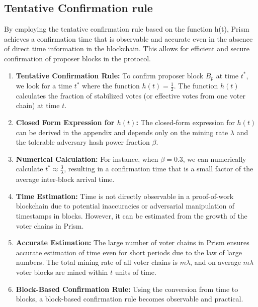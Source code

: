 \subsection{Tentative Confirmation rule}
By employing the tentative confirmation rule based on the function h(t), Prism achieves a confirmation time that is observable and accurate even in the absence of direct time information in the blockchain. This allows for efficient and secure confirmation of proposer blocks in the protocol.\\
\begin{enumerate}
    \item \textbf{Tentative Confirmation Rule:}  To confirm proposer block $B_{p}$ at time $t^{\ast}$, we look for a time $t^{\ast}$ where the function $h(t) = \frac{1}{2}$. The function $h(t)$ calculates the fraction of stabilized votes (or effective votes from one voter chain) at time $t$.
    \item \textbf{Closed Form Expression for $h(t)$:} The closed-form expression for $h(t)$ can be derived in the appendix and depends only on the mining rate $\lambda$ and the tolerable adversary hash power fraction $\beta$.
    \item \textbf{Numerical Calculation:} For instance, when $\beta = 0.3$, we can numerically calculate $t^{\ast} \approx \frac{3}{\lambda}$, resulting in a confirmation time that is a small factor of the average inter-block arrival time.
    \item \textbf{Time Estimation:} Time is not directly observable in a proof-of-work blockchain due to potential inaccuracies or adversarial manipulation of timestamps in blocks. However, it can be estimated from the growth of the voter chains in Prism.
    \item \textbf{Accurate Estimation:} The large number of voter chains in Prism ensures accurate estimation of time even for short periods due to the law of large numbers. The total mining rate of all voter chains is $m\lambda$, and on average $m\lambda$ voter blocks are mined within $t$ units of time.
    \item \textbf{Block-Based Confirmation Rule:} Using the conversion from time to blocks, a block-based confirmation rule becomes observable and practical.
\end{enumerate}
